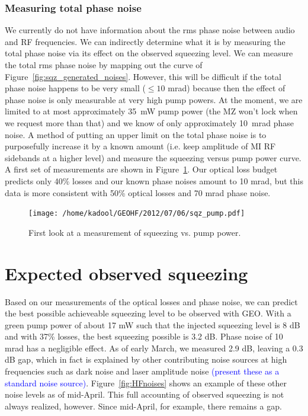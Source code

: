 \documentclass{ligodoc}
\begin{document}
\subsubsection{Measuring total phase noise}
We currently do not have information about the rms phase noise between
audio and RF frequencies. We can indirectly determine what it is by
measuring the total phase noise via its effect on the observed
squeezing level. We can measure the total rms phase noise by mapping
out the curve of Figure~\ref{fig:sqz_generated_noises}. However, this
will be difficult if the total phase noise happens to be very small
($\leq 10$ mrad) because then the effect of phase noise is only
measurable at very high pump powers. At the moment, we are limited to
at most approximately 35~mW pump power (the MZ won't lock when we
request more than that) and we know of only approximately 10~mrad
phase noise. A method of putting an upper limit on the total phase
noise is to purposefully increase it by a known amount (i.e. keep
amplitude of MI RF sidebands at a higher level) and measure the
squeezing versus pump power curve. A first set of measurements are
shown in Figure~\ref{fig:sqzpump}. Our optical loss budget predicts
only 40\% losses and our known phase noises amount to 10 mrad, but
this data is more consistent with 50\% optical losses and 70 mrad
phase noise.

\begin{figure}
\begin{centering}
\texttt{[image: /home/kadool/GEOHF/2012/07/06/sqz\_pump.pdf]}
\caption{First look at a measurement of squeezing vs. pump power.}
\label{fig:sqzpump}
\end{centering}
\end{figure}



\section{Expected observed squeezing}
Based on our measurements of the optical losses and phase noise, we
can predict the best possible achieveable squeezing level to be
observed with GEO. With a green pump power of about 17 mW such that
the injected squeezing level is 8 dB and with 37\% losses, the best
squeezing possible is 3.2 dB. Phase noise of 10 mrad has a negligible
effect. As of early March, we measured 2.9 dB, leaving a 0.3 dB gap,
which in fact is explained by other contributing noise sources at high
frequencies such as dark noise and laser amplitude noise
\textcolor{blue}{(present these as a standard noise
  source)}. Figure~\ref{fig:HFnoises} shows an example of these other
noise levels as of mid-April. This full accounting of observed
squeezing is not always realized, however. Since mid-April, for
example, there remains a gap.
\end{document}
